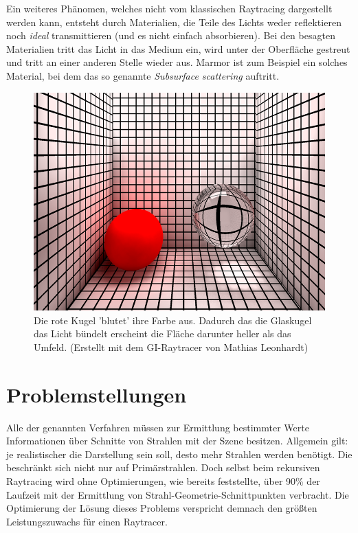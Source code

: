 Ein weiteres Phänomen, welches nicht vom klassischen Raytracing dargestellt werden kann, entsteht durch Materialien, die Teile des Lichts weder reflektieren noch \textit{ideal} transmittieren (und es nicht einfach absorbieren). Bei den besagten Materialien tritt das Licht in das Medium ein, wird unter der Oberfläche gestreut und tritt an einer anderen Stelle wieder aus. Marmor ist zum Beispiel ein solches Material, bei dem das so genannte \textit{Subsurface scattering} auftritt.
\begin{figure}
\begin{center}
\includegraphics[width=.6\textwidth]{images/gi.png}

\caption[Globale Beleuchtungsphänomene(Color bleeding, Caustics)]{Die rote Kugel 'blutet' ihre Farbe aus. Dadurch das die Glaskugel das Licht bündelt erscheint die Fläche darunter heller als das Umfeld. \footnotesize{(Erstellt mit dem GI-Raytracer von Mathias Leonhardt)}}
\label{fig:gi}\end{center}
\end{figure}

\section{Problemstellungen}

Alle der genannten Verfahren müssen zur Ermittlung bestimmter Werte Informationen über Schnitte von Strahlen mit der Szene besitzen. Allgemein gilt: je realistischer die Darstellung sein soll, desto mehr Strahlen werden benötigt. Die beschränkt sich nicht nur auf Primärstrahlen.
Doch selbst beim rekursiven Raytracing wird ohne Optimierungen, wie bereits \cite{Whitted80} feststellte, über 90\% der Laufzeit mit der Ermittlung von Strahl-Geometrie-Schnittpunkten verbracht. Die Optimierung der Lösung dieses Problems verspricht demnach den größten Leistungszuwachs für einen Raytracer. 

